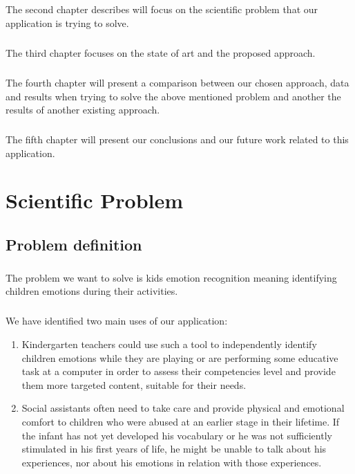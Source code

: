 \documentclass[runningheads,a4paper,11pt]{report}
\begin{document}
\paragraph{}
The second chapter describes will focus on the scientific problem that our application is trying to solve.

\paragraph{}
The third chapter focuses on the state of art and the proposed approach.

\paragraph{}
The fourth chapter will present a comparison between our chosen approach, data and results when trying to solve the above mentioned problem and another the results of another existing approach.

\paragraph{}
The fifth chapter will present our conclusions and our future work related to this application.

\chapter{Scientific Problem}
\label{section:scientificProblem}

\section{Problem definition}
\label{section:problemDefinition}
\paragraph{}
The problem we want to solve is kids emotion recognition meaning identifying children emotions during their activities.

\paragraph{}
We have identified two main uses of our application:
\begin{enumerate}
  \item Kindergarten teachers could use such a tool to independently identify children emotions while they are playing or are performing some educative task at a computer in order to assess their competencies level and provide them more targeted content, suitable for their needs.
  \item Social assistants often need to take care and provide physical and emotional comfort to children who were abused at an earlier stage in their lifetime. If the infant has not yet developed his vocabulary or he was not sufficiently stimulated in his first years of life, he might be unable to talk about his experiences, nor about his emotions in relation with those experiences.
\end{enumerate}
\end{document}
